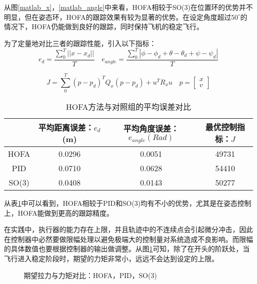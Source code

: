 从图\ref{matlab_x}，\ref{matlab_angle}中来看，HOFA相较于SO(3)在位置环的优势并不明显，但在姿态环，HOFA的跟踪效果有较为显著的优势。在设定角度超过$50^\circ$的情况下，HOFA仍能做到良好的跟踪，同时保持飞机的稳定飞行。

  
为了定量地对比三者的跟踪性能，引入以下指标：
  $$e_d=\frac{\sum_0^{T}||x-x_d||}{T} \quad e_{angle}=\frac{\sum_0^{T}|\phi-\phi_d+\theta-\theta_d+\psi-\psi_d|}{T}$$

  $$J=\sum_0^{T}(p-p_d)^T Q_x(p-p_d)+u^T R_x u \quad p=\begin{bmatrix}
    x \\ v
  \end{bmatrix}$$
  \begin{table}[h]
    \centering
    \begin{tabular}{cccc}
        \toprule
        & 平均距离误差：$e_d$ (m)& 平均角度误差：$e_{angle}(Rad)$  & 最优控制指标：$J$ \\
        \midrule
        HOFA & 0.0296 & 0.0051 &49731 \\
        PID & 0.0710 & 0.0628 &54410 \\
        SO(3) &0.0408  &0.0143 &50277 \\
        \bottomrule
    \end{tabular}
    \caption{HOFA方法与对照组的平均误差对比}
    \label{matlab对比}
\end{table}

从表\ref{matlab对比}中可以看到，HOFA相较于PID和SO(3)均有不小的优势，尤其是在姿态控制上，HOFA能做到更高的跟踪精度。

在实践中，执行器的能力存在上限，并且轨迹中的不连续点会引起微分冲击，因此在控制器中必然要做限幅处理以避免极端大的控制量对系统造成不良影响。而限幅的具体数值也要根据控制器的输出做调整。从图\ref{matlab_fM}可知，除了在开头的阶跃处，当飞行进入稳定阶段时，期望的力矩非常小，远远不会达到设定的上限。
\begin{figure}[h]
  \centering
  \begin{minipage}[t]{0.33\textwidth}
    \centering
  \end{minipage}\hfill
  \begin{minipage}[t]{0.33\textwidth}
    \centering
  \end{minipage}\hfill
  \begin{minipage}[t]{0.33\textwidth}
    \centering
  \end{minipage}
  \caption{期望拉力与力矩对比：HOFA，PID，SO(3)}
  \label{matlab_fM}
\end{figure}

